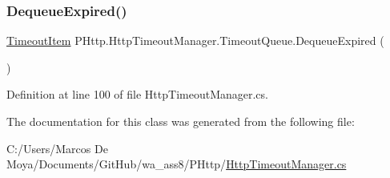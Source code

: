 \subsubsection{\texorpdfstring{Dequeue\+Expired()}{DequeueExpired()}}
{\footnotesize\ttfamily \hyperlink{class_p_http_1_1_http_timeout_manager_1_1_timeout_item}{Timeout\+Item} P\+Http.\+Http\+Timeout\+Manager.\+Timeout\+Queue.\+Dequeue\+Expired (\begin{DoxyParamCaption}{ }\end{DoxyParamCaption})}



Definition at line 100 of file Http\+Timeout\+Manager.\+cs.



The documentation for this class was generated from the following file\+:\begin{DoxyCompactItemize}
\item 
C\+:/\+Users/\+Marcos De Moya/\+Documents/\+Git\+Hub/wa\+\_\+ass8/\+P\+Http/\hyperlink{_http_timeout_manager_8cs}{Http\+Timeout\+Manager.\+cs}\end{DoxyCompactItemize}

